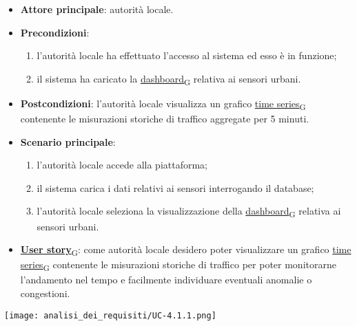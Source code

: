 \begin{itemize}
	\item \textbf{Attore principale}: autorità locale.
	\item \textbf{Precondizioni}:
	      \begin{enumerate}
		      \item l'autorità locale ha effettuato l'accesso al sistema ed esso è in funzione;
		      \item il sistema ha caricato la \href{https://7last.github.io/docs/pb/documentazione-interna/glossario\#dashboard}{dashboard\textsubscript{G}} relativa ai sensori urbani.
	      \end{enumerate}
	\item \textbf{Postcondizioni}: l'autorità locale visualizza un grafico \href{https://7last.github.io/docs/pb/documentazione-interna/glossario\#time-series}{time series\textsubscript{G}} contenente le misurazioni storiche di traffico aggregate per 5 minuti.
	\item \textbf{Scenario principale}:
	      \begin{enumerate}
		      \item l'autorità locale accede alla piattaforma;
		      \item il sistema carica i dati relativi ai sensori interrogando il database;
		      \item l'autorità locale seleziona la visualizzazione della \href{https://7last.github.io/docs/pb/documentazione-interna/glossario\#dashboard}{dashboard\textsubscript{G}} relativa ai sensori urbani.
	      \end{enumerate}
	\item \href{https://7last.github.io/docs/pb/documentazione-interna/glossario\#user-story}{\textbf{User story}\textsubscript{G}}:
	      come autorità locale desidero poter visualizzare un grafico \href{https://7last.github.io/docs/pb/documentazione-interna/glossario\#time-series}{time series\textsubscript{G}} contenente le misurazioni storiche
	      di traffico per poter monitorarne l'andamento nel tempo e facilmente individuare eventuali anomalie
	      o congestioni.
\end{itemize}
\begin{center}
	\texttt{[image: analisi\_dei\_requisiti/UC-4.1.1.png]}
\end{center}


